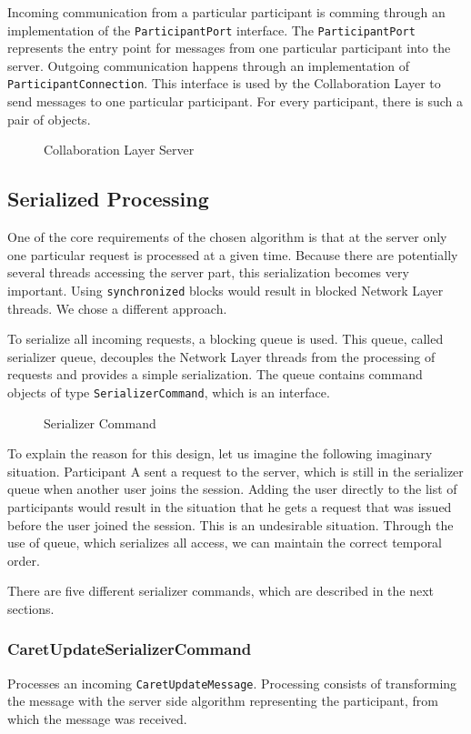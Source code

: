 Incoming communication from a particular participant is comming through an
implementation of the \texttt{ParticipantPort} interface. The 
\texttt{ParticipantPort} represents the entry point for messages from
one particular participant into the server. Outgoing communication happens 
through an implementation of 
\texttt{ParticipantConnection}. This interface is used by the Collaboration
Layer to send messages to one particular participant. For every participant, 
there is such a pair of objects. 

\begin{figure}[H]
 \centering
 
 \caption{Collaboration Layer Server}
\end{figure}

\subsection{Serialized Processing}
One of the core requirements of the chosen algorithm is that at the
server only one particular request is processed at a given time. Because
there are potentially several threads accessing the server part, this 
serialization becomes very important. Using \texttt{synchronized} blocks
would result in blocked Network Layer threads. We chose a different
approach.

To serialize all incoming requests, a blocking queue is used. This queue,
called serializer queue, decouples the Network Layer threads from the
processing of requests and provides a simple serialization. The queue
contains command objects of type \texttt{SerializerCommand}, which is an
interface.

\begin{figure}[H]
 \centering
 \caption{Serializer Command}
\end{figure}

To explain the reason for this design, let us imagine the following
imaginary situation. Participant A sent a request to the server, which is
still in the serializer queue when another user joins the session. Adding
the user directly to the list of participants would result in the situation
that he gets a request that was issued before the user joined the session.
This is an undesirable situation. Through the use of queue, which serializes
all access, we can maintain the correct temporal order.

There are five different serializer commands, which are described in the
next sections.

\subsubsection{CaretUpdateSerializerCommand} Processes an incoming
\texttt{CaretUpdateMessage}. Processing consists of transforming the
message with the server side algorithm representing the participant, from 
which the message was received.

